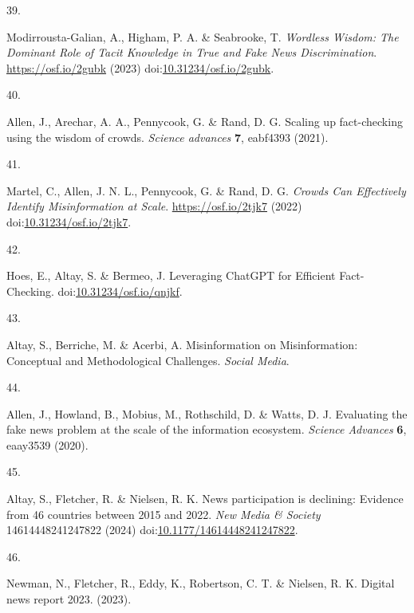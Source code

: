 \documentclass[
  man]{apa6}
\newlength{\cslhangindent}
\newlength{\csllabelwidth}
\newenvironment{CSLReferences}[2] %
 {\begin{list}{}{%
  \setlength{\itemindent}{0pt}
  \setlength{\leftmargin}{0pt}
  \setlength{\parsep}{0pt}
  \ifodd #1
   \setlength{\leftmargin}{\cslhangindent}
   \setlength{\itemindent}{-1\cslhangindent}
  \fi
  \setlength{\itemsep}{#2\baselineskip}}}
 {\end{list}}
\newcommand{\CSLLeftMargin}[1]{\parbox[t]{\csllabelwidth}{\strut#1\strut}}
\newcommand{\CSLRightInline}[1]{\parbox[t]{\linewidth - \csllabelwidth}{\strut#1\strut}}
\begin{document}
\begin{CSLReferences}{0}{0}
\CSLLeftMargin{39. }%
\CSLRightInline{Modirrousta-Galian, A., Higham, P. A. \& Seabrooke, T. \emph{Wordless Wisdom: The Dominant Role of Tacit Knowledge in True and Fake News Discrimination}. \url{https://osf.io/2gubk} (2023) doi:\href{https://doi.org/10.31234/osf.io/2gubk}{10.31234/osf.io/2gubk}.}

\CSLLeftMargin{40. }%
\CSLRightInline{*Allen, J., Arechar, A. A., Pennycook, G. \& Rand, D. G. Scaling up fact-checking using the wisdom of crowds. \emph{Science advances} \textbf{7}, eabf4393 (2021).}

\CSLLeftMargin{41. }%
\CSLRightInline{Martel, C., Allen, J. N. L., Pennycook, G. \& Rand, D. G. \emph{Crowds Can Effectively Identify Misinformation at Scale}. \url{https://osf.io/2tjk7} (2022) doi:\href{https://doi.org/10.31234/osf.io/2tjk7}{10.31234/osf.io/2tjk7}.}

\CSLLeftMargin{42. }%
\CSLRightInline{Hoes, E., Altay, S. \& Bermeo, J. Leveraging ChatGPT for Efficient Fact-Checking. doi:\href{https://doi.org/10.31234/osf.io/qnjkf}{10.31234/osf.io/qnjkf}.}

\CSLLeftMargin{43. }%
\CSLRightInline{Altay, S., Berriche, M. \& Acerbi, A. Misinformation on Misinformation: Conceptual and Methodological Challenges. \emph{Social Media}.}

\CSLLeftMargin{44. }%
\CSLRightInline{Allen, J., Howland, B., Mobius, M., Rothschild, D. \& Watts, D. J. Evaluating the fake news problem at the scale of the information ecosystem. \emph{Science Advances} \textbf{6}, eaay3539 (2020).}

\CSLLeftMargin{45. }%
\CSLRightInline{Altay, S., Fletcher, R. \& Nielsen, R. K. News participation is declining: Evidence from 46 countries between 2015 and 2022. \emph{New Media \& Society} 14614448241247822 (2024) doi:\href{https://doi.org/10.1177/14614448241247822}{10.1177/14614448241247822}.}

\CSLLeftMargin{46. }%
\CSLRightInline{Newman, N., Fletcher, R., Eddy, K., Robertson, C. T. \& Nielsen, R. K. Digital news report 2023. (2023).}


\end{CSLReferences}
\end{document}
